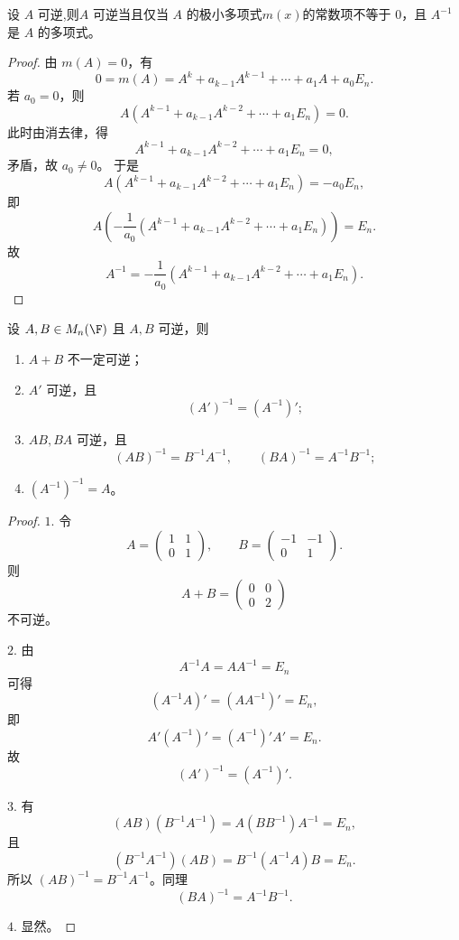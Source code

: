 \begin{proposition}\label{3.4.3}
	设 $A$ 可逆,则$A$ 可逆当且仅当 $A$ 的极小多项式$m(x)$的常数项不等于 $0$，且 $A^{-1}$ 是 $A$ 的多项式。
\end{proposition}

\begin{proof}
	由 $m(A)=0$，有
	\[
	0=m(A)=A^k+a_{k-1}A^{k-1}+\cdots+a_1A+a_0E_n.
	\]
	若 $a_0=0$，则
	\[
	A\left(A^{k-1}+a_{k-1}A^{k-2}+\cdots+a_1E_n\right)=0.
	\]
	此时由消去律，得
	\[
	A^{k-1}+a_{k-1}A^{k-2}+\cdots+a_1E_n=0,
	\]
	矛盾，故 $a_0\neq0$。
	于是
	\[
	A\left(A^{k-1}+a_{k-1}A^{k-2}+\cdots+a_1E_n\right)=-a_0E_n,
	\]
	即
	\[
	A\left(-\frac1{a_0}\left(A^{k-1}+a_{k-1}A^{k-2}+\cdots+a_1E_n\right)\right)=E_n.
	\]
	故
	\[
	A^{-1}=-\frac1{a_0}\left(A^{k-1}+a_{k-1}A^{k-2}+\cdots+a_1E_n\right).
	\]
\end{proof}

\begin{proposition}\label{3.4.4}
	设 $A,B\in M_n(\F)$ 且 $A,B$ 可逆，则
	\begin{enumerate}
		\item $A+B$ 不一定可逆；
		\item $A'$ 可逆，且
		\[
		(A')^{-1}=(A^{-1})';
		\]
		\item $AB,BA$ 可逆，且
		\[
		(AB)^{-1}=B^{-1}A^{-1},\qquad (BA)^{-1}=A^{-1}B^{-1};
		\]
		\item $(A^{-1})^{-1}=A$。
	\end{enumerate}
\end{proposition}

\begin{proof}
	$1.$ 令
	\[
	A=\begin{pmatrix}1&1\\0&1\end{pmatrix},
	\qquad
	B=\begin{pmatrix}-1&-1\\0&1\end{pmatrix}.
	\]
	则
	\[
	A+B=\begin{pmatrix}0&0\\0&2\end{pmatrix}
	\]
	不可逆。
	
	$2.$ 由
	\[
	A^{-1}A=AA^{-1}=E_n
	\]
	可得
	\[
	(A^{-1}A)'=(AA^{-1})'=E_n,
	\]
	即
	\[
	A'(A^{-1})'=(A^{-1})'A'=E_n.
	\]
	故
	\[
	(A')^{-1}=(A^{-1})'.
	\]
	
	$3.$ 有
	\[
	(AB)(B^{-1}A^{-1})=A(BB^{-1})A^{-1}=E_n,
	\]
	且
	\[
	(B^{-1}A^{-1})(AB)=B^{-1}(A^{-1}A)B=E_n.
	\]
	所以 $(AB)^{-1}=B^{-1}A^{-1}$。同理
	\[
	(BA)^{-1}=A^{-1}B^{-1}.
	\]
	
	$4.$ 显然。
\end{proof}

